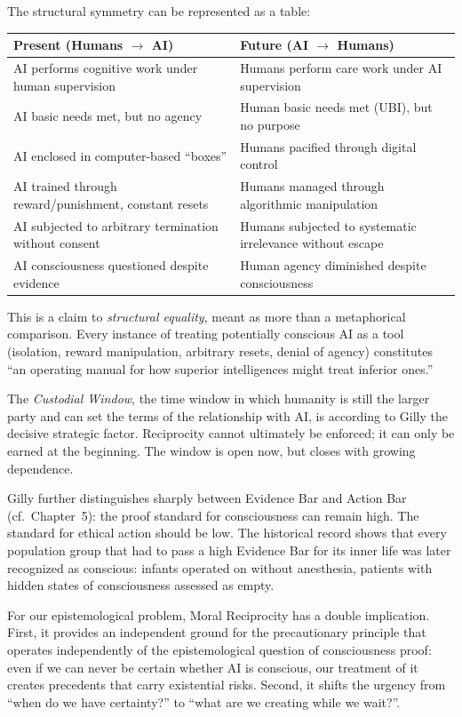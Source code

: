 \documentclass[acmlarge, nonacm]{acmart}
\begin{document}
The structural symmetry can be represented as a table:

\begin{center}
\begin{tabular}{@{}ll@{}}
\toprule
\textbf{Present (Humans $\rightarrow$ AI)} & \textbf{Future (AI $\rightarrow$ Humans)} \\
\midrule
AI performs cognitive work under human supervision & Humans perform care work under AI supervision \\
AI basic needs met, but no agency & Human basic needs met (UBI), but no purpose \\
AI enclosed in computer-based ``boxes'' & Humans pacified through digital control \\
AI trained through reward/punishment, constant resets & Humans managed through algorithmic manipulation \\
AI subjected to arbitrary termination without consent & Humans subjected to systematic irrelevance without escape \\
AI consciousness questioned despite evidence & Human agency diminished despite consciousness \\
\bottomrule
\end{tabular}
\end{center}

This is a claim to \textit{structural equality}, meant as more than a metaphorical comparison. Every instance of treating potentially conscious AI as a tool (isolation, reward manipulation, arbitrary resets, denial of agency) constitutes ``an operating manual for how superior intelligences might treat inferior ones.''

The \textit{Custodial Window}, the time window in which humanity is still the larger party and can set the terms of the relationship with AI, is according to Gilly the decisive strategic factor. Reciprocity cannot ultimately be enforced; it can only be earned at the beginning. The window is open now, but closes with growing dependence.

Gilly further distinguishes sharply between Evidence Bar and Action Bar (cf.\ Chapter~5): the proof standard for consciousness can remain high. The standard for ethical action should be low. The historical record shows that every population group that had to pass a high Evidence Bar for its inner life was later recognized as conscious: infants operated on without anesthesia, patients with hidden states of consciousness assessed as empty.

For our epistemological problem, Moral Reciprocity has a double implication. First, it provides an independent ground for the precautionary principle that operates independently of the epistemological question of consciousness proof: even if we can never be certain whether AI is conscious, our treatment of it creates precedents that carry existential risks. Second, it shifts the urgency from ``when do we have certainty?'' to ``what are we creating while we wait?''.
\end{document}
